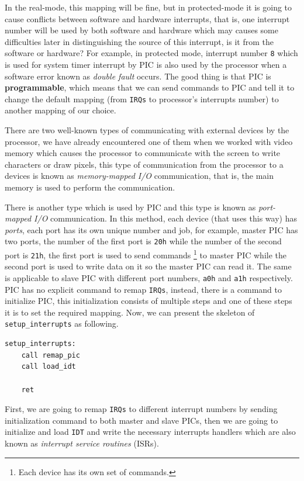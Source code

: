 In the real-mode, this mapping will be fine, but in protected-mode it is
going to cause conflicts between software and hardware interrupts, that
is, one interrupt number will be used by both software and hardware
which may causes some difficulties later in distinguishing the source of
this interrupt, is it from the software or hardware? For example, in
protected mode, interrupt number \lstinline!8! which is used for system
timer interrupt by PIC is also used by the processor when a software
error known as \emph{double fault} occurs. The good thing is that PIC is
\textbf{programmable}, which means that we can send commands to PIC and
tell it to change the default mapping (from \lstinline!IRQs! to
processor's interrupts number) to another mapping of our choice.

There are two well-known types of communicating with external devices by
the processor, we have already encountered one of them when we worked
with video memory which causes the processor to communicate with the
screen to write characters or draw pixels, this type of communication
from the processor to a devices is known as \emph{memory-mapped I/O}
communication, that is, the main memory is used to perform the
communication.

There is another type which is used by PIC and this type is known as
\emph{port-mapped I/O} communication. In this method, each device (that
uses this way) has \emph{ports}, each port has its own unique number and
job, for example, master PIC has two ports, the number of the first port
is \lstinline!20h! while the number of the second port is
\lstinline!21h!, the first port is used to send commands \footnote{Each
  device has its own set of commands.} to master PIC while the second
port is used to write data on it so the master PIC can read it. The same
is applicable to slave PIC with different port numbers, \lstinline!a0h!
and \lstinline!a1h! respectively. PIC has no explicit command to remap
\lstinline!IRQs!, instead, there is a command to initialize PIC, this
initialization consists of multiple steps and one of these steps it is
to set the required mapping. Now, we can present the skeleton of
\lstinline!setup_interrupts! as following.

\begin{lstlisting}
setup_interrupts:
    call remap_pic
    call load_idt
    
    ret
\end{lstlisting}

First, we are going to remap \lstinline!IRQs! to different interrupt
numbers by sending initialization command to both master and slave PICs,
then we are going to initialize and load \lstinline!IDT! and write the
necessary interrupts handlers which are also known as \emph{interrupt
service routines} (ISRs).

